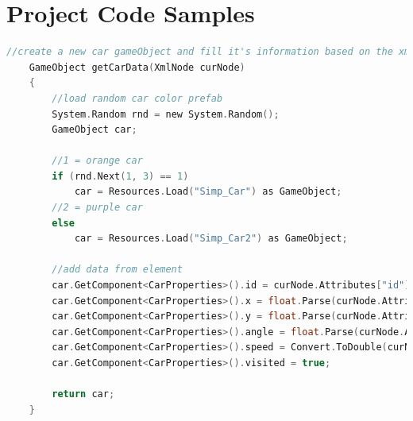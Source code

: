 \documentclass[letterpaper, 10pt, onecolumn, draftclsnofoot]{IEEEtran}
\begin{document}
\section{Project Code Samples}
    
    \begin{lstlisting}[language=c, style=mystyle, caption=Andrew-Stebel - Getting car data from a SUMO output file Via a Unity Asset\cite{andrew-stebel}]
    //create a new car gameObject and fill it's information based on the xml element
    GameObject getCarData(XmlNode curNode)
    {
        //load random car color prefab
        System.Random rnd = new System.Random();
        GameObject car;

        //1 = orange car
        if (rnd.Next(1, 3) == 1)
            car = Resources.Load("Simp_Car") as GameObject;
        //2 = purple car
        else
            car = Resources.Load("Simp_Car2") as GameObject;

        //add data from element
        car.GetComponent<CarProperties>().id = curNode.Attributes["id"].Value;
        car.GetComponent<CarProperties>().x = float.Parse(curNode.Attributes["x"].Value);
        car.GetComponent<CarProperties>().y = float.Parse(curNode.Attributes["y"].Value);
        car.GetComponent<CarProperties>().angle = float.Parse(curNode.Attributes["angle"].Value);
        car.GetComponent<CarProperties>().speed = Convert.ToDouble(curNode.Attributes["speed"].Value);
        car.GetComponent<CarProperties>().visited = true;

        return car;
    }
    \end{lstlisting}
    
\end{document}
